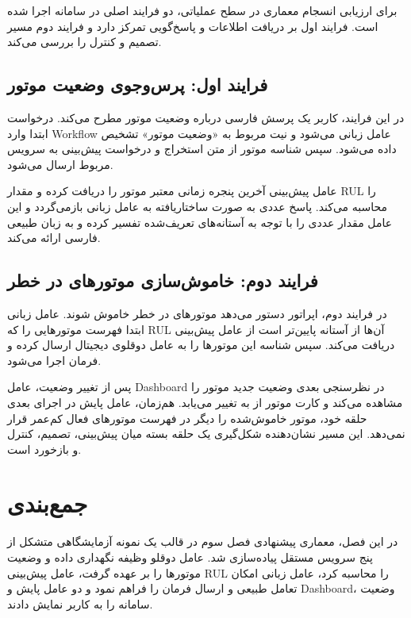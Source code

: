 برای ارزیابی انسجام معماری در سطح عملیاتی، دو فرایند اصلی در سامانه اجرا شده است. فرایند اول بر دریافت اطلاعات و پاسخ‌گویی تمرکز دارد و فرایند دوم مسیر تصمیم و کنترل را بررسی می‌کند.

\subsection{فرایند اول: پرس‌وجوی وضعیت موتور}

در این فرایند، کاربر یک پرسش فارسی درباره وضعیت موتور مطرح می‌کند. درخواست ابتدا وارد \gls{Workflow} عامل زبانی می‌شود و نیت مربوط به «وضعیت موتور» تشخیص داده می‌شود. سپس شناسه موتور از متن استخراج و درخواست پیش‌بینی به سرویس مربوط ارسال می‌شود.

عامل پیش‌بینی آخرین پنجره زمانی معتبر موتور را دریافت کرده و مقدار \gls{RUL} را محاسبه می‌کند. پاسخ عددی به صورت ساختاریافته به عامل زبانی بازمی‌گردد و این عامل مقدار عددی را با توجه به آستانه‌های تعریف‌شده تفسیر کرده و به زبان طبیعی فارسی ارائه می‌کند.



\subsection{فرایند دوم: خاموش‌سازی موتورهای در خطر}

در فرایند دوم، اپراتور دستور می‌دهد موتورهای در خطر خاموش شوند. عامل زبانی ابتدا فهرست موتورهایی را که \gls{RUL} آن‌ها از آستانه پایین‌تر است از عامل پیش‌بینی دریافت می‌کند. سپس شناسه این موتورها را به عامل دوقلوی دیجیتال ارسال کرده و فرمان  اجرا می‌شود.

پس از تغییر وضعیت، عامل \gls{Dashboard} در نظرسنجی بعدی وضعیت جدید موتور را مشاهده می‌کند و کارت موتور از  به  تغییر می‌یابد. هم‌زمان، عامل پایش در اجرای بعدی حلقه خود، موتور خاموش‌شده را دیگر در فهرست موتورهای فعال کم‌عمر قرار نمی‌دهد. این مسیر نشان‌دهنده شکل‌گیری یک حلقه بسته میان پیش‌بینی، تصمیم، کنترل و بازخورد است.


\section{جمع‌بندی}
\label{sec:impl-summary}

در این فصل، معماری پیشنهادی فصل سوم در قالب یک نمونه آزمایشگاهی متشکل از پنج سرویس مستقل پیاده‌سازی شد. عامل دوقلو وظیفه نگهداری داده و وضعیت موتور‌ها را بر عهده گرفت، عامل پیش‌بینی \gls{RUL} را محاسبه کرد، عامل زبانی امکان تعامل طبیعی و ارسال فرمان را فراهم نمود و دو عامل پایش و \gls{Dashboard}، وضعیت سامانه را به کاربر نمایش دادند.

